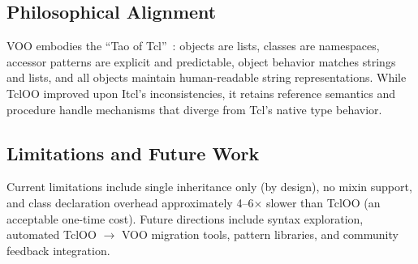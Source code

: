 \subsection{Philosophical Alignment}

VOO embodies the ``Tao of Tcl''~\cite{ousterhout1994}: objects are lists, classes are
namespaces, accessor patterns are explicit and predictable, object behavior matches strings
and lists, and all objects maintain human-readable string representations. While TclOO
improved upon Itcl's inconsistencies, it retains reference semantics and procedure handle
mechanisms that diverge from Tcl's native type behavior.

\subsection{Limitations and Future Work}

Current limitations include single inheritance only (by design), no mixin support, and
class declaration overhead approximately 4--6$\times$ slower than TclOO (an acceptable
one-time cost). Future directions include syntax exploration, automated TclOO $\to$ VOO
migration tools, pattern libraries, and community feedback integration.
